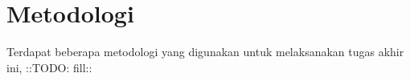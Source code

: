 \section{Metodologi}

Terdapat beberapa metodologi yang digunakan untuk melaksanakan tugas akhir ini, ::TODO: fill::